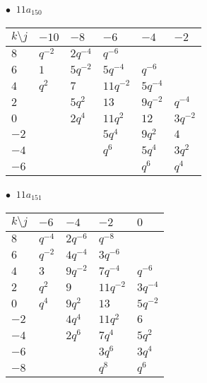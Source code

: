 \begin{minipage}{\linewidth}
$\bullet\ $ $11a_{150}$ \vspace{0.5em} \\
\begin{tabular}{l|lllll}
$k \setminus j$ & $-10$ & $-8$ & $-6$ & $-4$ & $-2$ \\
\hline
$8$ & $q^{-2}$ & $2q^{-4}$ & $q^{-6}$ &  &  \\
$6$ & $1$ & $5q^{-2}$ & $5q^{-4}$ & $q^{-6}$ &  \\
$4$ & $q^{2}$ & $7$ & $11q^{-2}$ & $5q^{-4}$ &  \\
$2$ &  & $5q^{2}$ & $13$ & $9q^{-2}$ & $q^{-4}$ \\
$0$ &  & $2q^{4}$ & $11q^{2}$ & $12$ & $3q^{-2}$ \\
$-2$ &  &  & $5q^{4}$ & $9q^{2}$ & $4$ \\
$-4$ &  &  & $q^{6}$ & $5q^{4}$ & $3q^{2}$ \\
$-6$ &  &  &  & $q^{6}$ & $q^{4}$ \\
\end{tabular}
\vspace{2em}
\end{minipage}
%
\begin{minipage}{\linewidth}
$\bullet\ $ $11a_{151}$ \vspace{0.5em} \\
\begin{tabular}{l|llll}
$k \setminus j$ & $-6$ & $-4$ & $-2$ & $0$ \\
\hline
$8$ & $q^{-4}$ & $2q^{-6}$ & $q^{-8}$ &  \\
$6$ & $q^{-2}$ & $4q^{-4}$ & $3q^{-6}$ &  \\
$4$ & $3$ & $9q^{-2}$ & $7q^{-4}$ & $q^{-6}$ \\
$2$ & $q^{2}$ & $9$ & $11q^{-2}$ & $3q^{-4}$ \\
$0$ & $q^{4}$ & $9q^{2}$ & $13$ & $5q^{-2}$ \\
$-2$ &  & $4q^{4}$ & $11q^{2}$ & $6$ \\
$-4$ &  & $2q^{6}$ & $7q^{4}$ & $5q^{2}$ \\
$-6$ &  &  & $3q^{6}$ & $3q^{4}$ \\
$-8$ &  &  & $q^{8}$ & $q^{6}$ \\
\end{tabular}
\vspace{2em}
\end{minipage}
%
